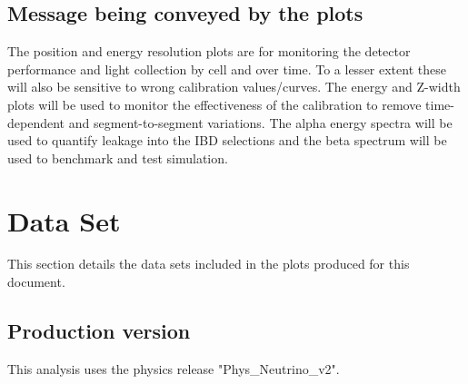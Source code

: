 \subsection{Message being conveyed by the plots}
The position and energy resolution plots are for monitoring the detector performance and light collection by cell and over time. To a lesser extent these will also be sensitive to wrong calibration values/curves. The energy and Z-width plots will be used to monitor the effectiveness of the calibration to remove time-dependent and segment-to-segment variations. The alpha energy spectra will be used to quantify leakage into the IBD selections and the beta spectrum will be used to benchmark and test simulation.

\section{Data Set}
This section details the data sets included in the plots produced for this document.
\subsection{Production version}
This analysis uses the physics release "Phys\_Neutrino\_v2".
